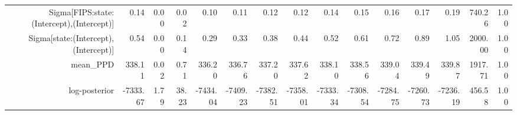 \begin{table}[ht]
\begin{tabular}{rrrrrrrrrrrrrrr}
  Sigma[FIPS:state:(Intercept),(Intercept)] & 0.14 & 0.00 & 0.02 & 0.10 & 0.11 & 0.12 & 0.12 & 0.14 & 0.15 & 0.16 & 0.17 & 0.19 & 740.26 & 1.00 \\ 
  Sigma[state:(Intercept),(Intercept)] & 0.54 & 0.00 & 0.14 & 0.29 & 0.33 & 0.38 & 0.44 & 0.52 & 0.61 & 0.72 & 0.89 & 1.05 & 2000.00 & 1.00 \\ 
  mean\_PPD & 338.11 & 0.02 & 0.71 & 336.20 & 336.76 & 337.20 & 337.62 & 338.10 & 338.56 & 339.04 & 339.49 & 339.87 & 1917.71 & 1.00 \\ 
  log-posterior & -7333.67 & 1.79 & 38.23 & -7434.04 & -7409.23 & -7382.51 & -7358.01 & -7333.34 & -7308.54 & -7284.75 & -7260.73 & -7236.19 & 456.58 & 1.00 \\ 
   \hline
\end{tabular}
\end{table}
